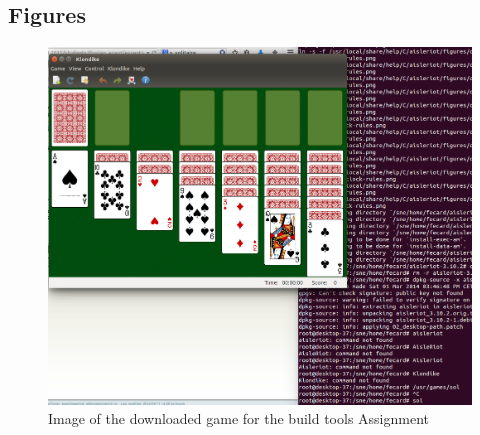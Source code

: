 		\subsection{Figures}
			\begin{figure}[h!]
				\begin{center}
					\includegraphics[scale=0.2]{sol.png}
					\caption{Image of the downloaded game for the build tools Assignment}
					\label{sec:images}
				\end{center}
			\end{figure}